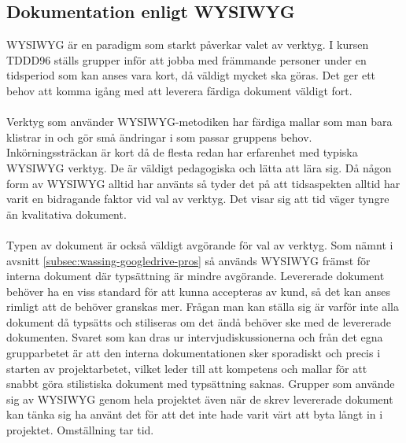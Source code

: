 \subsection{Dokumentation enligt WYSIWYG}
\label{subsec:wassing_documentation_by_wysiwyg}
WYSIWYG är en paradigm som starkt påverkar valet av verktyg. I kursen TDDD96 ställs grupper inför att jobba med främmande personer under en tidsperiod som kan anses vara kort, då väldigt mycket ska göras. Det ger ett behov att komma igång med att leverera färdiga dokument väldigt fort.\\ \\
Verktyg som använder WYSIWYG-metodiken har färdiga mallar som man bara klistrar in och gör små ändringar i som passar gruppens behov. Inkörningssträckan är kort då de flesta redan har erfarenhet med typiska WYSIWYG verktyg. De är väldigt pedagogiska och lätta att lära sig. Då någon form av WYSIWYG alltid har använts så tyder det på att tidsaspekten alltid har varit en bidragande faktor vid val av verktyg. Det visar sig att tid väger tyngre än kvalitativa dokument.
\\ \\
Typen av dokument är också väldigt avgörande för val av verktyg. Som nämnt i avsnitt \ref{subsec:wassing-googledrive-pros} så används WYSIWYG främst för interna dokument där typsättning är mindre avgörande. Levererade dokument behöver ha en viss standard för att kunna accepteras av kund, så det kan anses rimligt att de behöver granskas mer. Frågan man kan ställa sig är varför inte alla dokument då typsätts och stiliseras om det ändå behöver ske med de levererade dokumenten. Svaret som kan dras ur intervjudiskussionerna och från det egna grupparbetet är att den interna dokumentationen sker sporadiskt och precis i starten av projektarbetet, vilket leder till att kompetens och mallar för att snabbt göra stilistiska dokument med typsättning saknas. Grupper som använde sig av WYSIWYG genom hela projektet även när de skrev levererade dokument kan tänka sig ha använt det för att det inte hade varit värt att byta långt in i projektet. Omställning tar tid.

